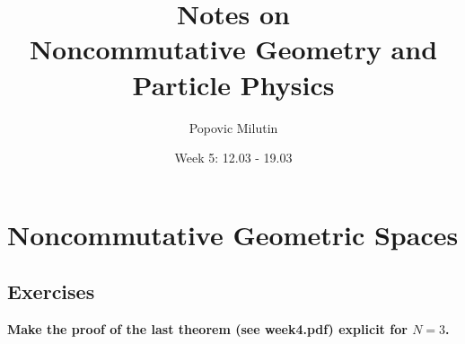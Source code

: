 \documentclass[a4paper]{article}
\title{Notes on \\ Noncommutative Geometry and Particle Physics}
\author{Popovic Milutin}
\date{Week 5: 12.03 - 19.03}
\newcounter{exercise}
\newenvironment{MyExercise}%
{\begin{mdframed}[style=exercisestyle]}{\end{mdframed}}
\theoremstyle{definition}
\theoremstyle{definition}
\theoremstyle{definition}
\theoremstyle{theorem}
\theoremstyle{theorem}
\begin{document}
\maketitle
\tableofcontents

\section{Noncommutative Geometric Spaces }
\subsection{Exercises}

\begin{MyExercise}
\textbf{
    Make the proof of the last theorem (see week4.pdf) explicit for $N=3$.
}\newline


\end{MyExercise}
\end{document}
